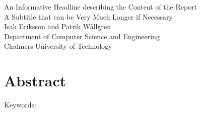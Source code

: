 An Informative Headline describing the Content of the Report\\
A Subtitle that can be Very Much Longer if Necessary\\
Isak Eriksson and Patrik Wållgren\\
Department of Computer Science and Engineering\\
Chalmers University of Technology \setlength{\parskip}{0.5cm}

\thispagestyle{plain}			%
\section*{Abstract}
 

\vfill
Keywords: 

\newpage				%
\thispagestyle{empty}
\mbox{}